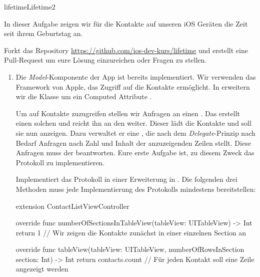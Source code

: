 \documentclass[parskip=half, final]{scrreprt}
\begin{document}
\begin{lecture}


\begin{exc}

\begin{excitem}{lifetime}{Lifetime}{2}

In dieser Aufgabe zeigen wir für die Kontakte auf unseren iOS Geräten die Zeit seit ihrem Geburtstag an.

Forkt das Repository \url{https://github.com/ios-dev-kurs/lifetime} und erstellt eine Pull-Request um eure Lösung einzureichen oder Fragen zu stellen.


\begin{enumerate}

\item Die \emph{Model}-Komponente \mvcindicatormodel der App ist bereits implementiert. Wir verwenden das  Framework von Apple, das Zugriff auf die Kontakte ermöglicht. In  erweitern wir die Klasse  um ein Computed Attribute .

\mvcindicatorcontroller Um auf Kontakte zuzugreifen stellen wir Anfragen an einen . Das  erstellt einen solchen und reicht ihn an den  weiter. Dieser lädt die Kontakte und soll sie nun anzeigen. Dazu verwaltet er eine , die nach dem \emph{Delegate}-Prinzip nach Bedarf Anfragen nach Zahl und Inhalt der anzuzeigenden Zeilen stellt. Diese Anfragen muss der  beantworten. Eure erste Aufgabe ist, zu diesem Zweck das  Protokoll zu implementieren.

Implementiert das Protokoll in einer Erweiterung in . Die folgenden drei Methoden muss jede Implementierung des Protokolls mindestens bereitstellen:

\begin{swiftcode}
extension ContactListViewController {

    override func numberOfSectionsInTableView(tableView: UITableView) -> Int {
        return 1 // Wir zeigen die Kontakte zunächst in einer einzelnen Section an
    }

    override func tableView(tableView: UITableView, numberOfRowsInSection section: Int) -> Int {
        return contacts.count // Für jeden Kontakt soll eine Zeile angezeigt werden
    }

}
\end{swiftcode}
\end{enumerate}
\end{excitem}
\end{exc}
\end{lecture}
\end{document}

